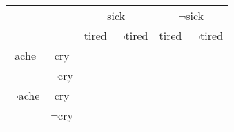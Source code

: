 \documentclass{article}%
\begin{document}
\begin{enumerate}
	\begin{table}[h]
	\centering
	\begin{tabular}{|c|c|c|c|c|c|}
	\hline
	\multicolumn{2}{|c|}{}&\multicolumn{2}{c|}{sick}&\multicolumn{2}{c|}{$\neg$sick} \\ \cline{3-6}
	\multicolumn{2}{|c|}{}&tired&$\neg$tired&tired&$\neg$tired \\ \hline
	ache&cry& & & & \\ \cline{2-6}
	&$\neg$cry& & & & \\ \hline
	$\neg$ache&cry& & & & \\ \cline{2-6}
	&$\neg$cry& & & & \\ \hline
	\end{tabular}
	\end{table}
	 
\end{enumerate}
\end{document}

